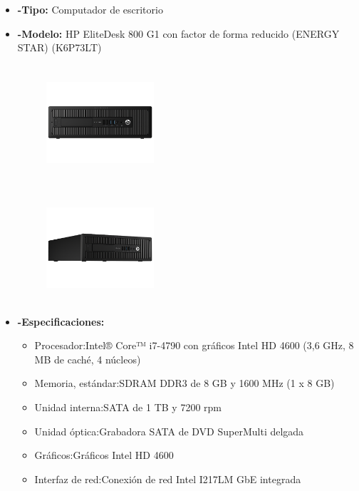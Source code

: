 \documentclass{udpreport}
\begin{document}
\begin{itemize}
		\item{\bf-Tipo:} Computador de escritorio\\
		\item{\bf-Modelo:}  HP EliteDesk 800 G1 con factor de forma reducido (ENERGY STAR)
		(K6P73LT)\\
		\begin{figure}[h]
    		\centering
    	\includegraphics[width=4cm, height=4.3cm]{pchp1.png}
		\end{figure}
		\begin{figure}[h]
    		\centering
    	\includegraphics[width=4cm, height=4cm]{pchp2.png}
		\end{figure}
		\item{\bf-Especificaciones:}
		\begin{itemize}
			\item Procesador:Intel® Core™ i7-4790 con gráficos Intel HD 4600 (3,6 GHz, 8 MB de caché, 4 núcleos)\\
			\item Memoria, estándar:SDRAM DDR3 de 8 GB y 1600 MHz (1 x 8 GB)\\
			\item Unidad interna:SATA de 1 TB y 7200 rpm\\
			\item Unidad óptica:Grabadora SATA de DVD SuperMulti delgada\\
			\item Gráficos:Gráficos Intel HD 4600\\
			\item Interfaz de red:Conexión de red Intel I217LM GbE integrada\\

\end{itemize}
\end{itemize}
\end{document}

